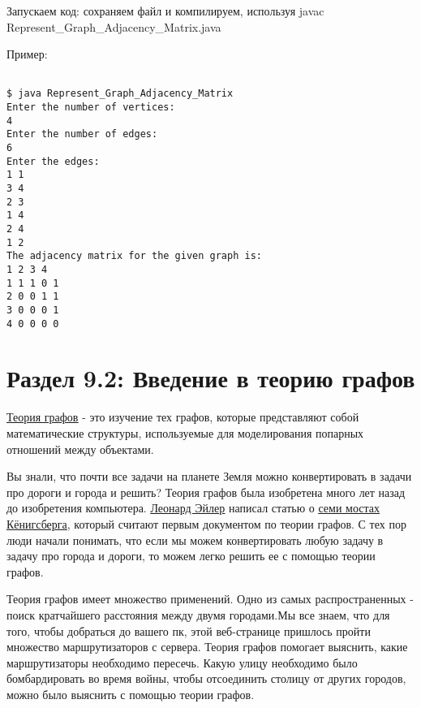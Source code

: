 Запускаем код: сохраняем файл и компилируем, используя javac Represent\_Graph\_Adjacency\_Matrix.java

\vspace{\baselineskip}
Пример:
\begin{tcolorbox}
\begin{verbatim}

$ java Represent_Graph_Adjacency_Matrix
Enter the number of vertices:
4
Enter the number of edges:
6
Enter the edges:
1 1
3 4
2 3
1 4
2 4
1 2
The adjacency matrix for the given graph is:
1 2 3 4
1 1 1 0 1
2 0 0 1 1
3 0 0 0 1
4 0 0 0 0

\end{verbatim}
\end{tcolorbox}

\vspace{-0.2cm}
\section*{Раздел 9.2: Введение в теорию графов}
\href{https://en.wikipedia.org/wiki/Graph_theory}{\underline{Теория графов}} - это изучение тех графов, которые представляют собой математические структуры, используемые для моделирования попарных отношений между объектами.

\vspace{\baselineskip}
Вы знали, что почти все задачи на планете Земля можно конвертировать в задачи про дороги и города и решить? Теория графов была изобретена много лет назад до изобретения компьютера. \href{https://en.wikipedia.org/wiki/Leonhard_Euler}{\underline{Леонард Эйлер}} написал статью о \href{https://en.wikipedia.org/wiki/Seven_Bridges_of_Konigsberg}{\underline{семи мостах Кёнигсберга}}, который считают первым документом по теории графов. С тех пор люди начали понимать, что если мы можем конвертировать любую задачу в задачу про города и дороги, то можем легко решить ее с помощью теории графов.

\vspace{\baselineskip}
Теория графов имеет множество применений. Одно из самых распространенных  - поиск  кратчайшего расстояния между двумя городами.Мы все знаем, что для того, чтобы добраться до вашего пк, этой веб-странице пришлось пройти множество маршрутизаторов с сервера. Теория графов помогает выяснить, какие маршрутизаторы необходимо пересечь. Какую улицу необходимо было бомбардировать во время войны, чтобы отсоединить столицу от других городов, можно было выяснить с помощью теории графов.

